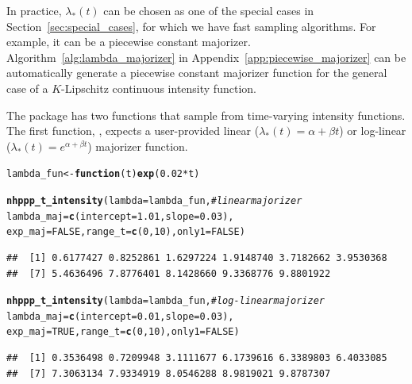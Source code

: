 \documentclass[article,nojss]{jss}\usepackage[]{graphicx}\usepackage[]{xcolor}
\makeatletter
\newcommand{\hlnum}[1]{\textcolor[rgb]{0.686,0.059,0.569}{#1}}%
\newcommand{\hlcom}[1]{\textcolor[rgb]{0.678,0.584,0.686}{\textit{#1}}}%
\newcommand{\hlopt}[1]{\textcolor[rgb]{0,0,0}{#1}}%
\newcommand{\hlstd}[1]{\textcolor[rgb]{0.345,0.345,0.345}{#1}}%
\newcommand{\hlkwa}[1]{\textcolor[rgb]{0.161,0.373,0.58}{\textbf{#1}}}%
\newcommand{\hlkwb}[1]{\textcolor[rgb]{0.69,0.353,0.396}{#1}}%
\newcommand{\hlkwc}[1]{\textcolor[rgb]{0.333,0.667,0.333}{#1}}%
\newcommand{\hlkwd}[1]{\textcolor[rgb]{0.737,0.353,0.396}{\textbf{#1}}}%
\newenvironment{kframe}{%
 \def\at@end@of@kframe{}%
 \ifinner\ifhmode%
  \def\at@end@of@kframe{\end{minipage}}%
  \begin{minipage}{\columnwidth}%
 \fi\fi%
 \def\FrameCommand##1{\hskip\@totalleftmargin \hskip-\fboxsep
 \colorbox{shadecolor}{##1}\hskip-\fboxsep
     \hskip-\linewidth \hskip-\@totalleftmargin \hskip\columnwidth}%
 \MakeFramed {\advance\hsize-\width
   \@totalleftmargin\z@ \linewidth\hsize
   \@setminipage}}%
 {\par\unskip\endMakeFramed%
 \at@end@of@kframe}
\newenvironment{knitrout}{}{} %
\newcommand{\fct}[1]{\code{#1()}}
\makeatother
\begin{document}
In practice, $\lambda_*(t)$ can be chosen as one of the special cases in Section~\ref{sec:special_cases}, for which we have fast sampling algorithms. For example, it can be a piecewise constant majorizer. Algorithm~\ref{alg:lambda_majorizer} in Appendix~\ref{app:piecewise_majorizer} can be automatically generate a piecewise constant majorizer function for the general case of a $K$-Lipschitz continuous intensity function.

The  package has two functions that sample from time-varying intensity functions. The first function, \fct{nhppp\_t\_intensity}, expects a user-provided linear ($\lambda_*(t) = \alpha + \beta t$) or log-linear ($\lambda_*(t) = e^{\alpha + \beta t}$) majorizer function.

\begin{knitrout}
\color{fgcolor}\begin{kframe}
\begin{alltt}
\hlstd{lambda_fun} \hlkwb{<-} \hlkwa{function}\hlstd{(}\hlkwc{t}\hlstd{)} \hlkwd{exp}\hlstd{(}\hlnum{0.02}\hlopt{*}\hlstd{t)}

\hlkwd{nhppp_t_intensity}\hlstd{(}\hlkwc{lambda} \hlstd{= lambda_fun,}         \hlcom{# linear majorizer}
  \hlkwc{lambda_maj} \hlstd{=} \hlkwd{c}\hlstd{(}\hlkwc{intercept} \hlstd{=} \hlnum{1.01}\hlstd{,} \hlkwc{slope} \hlstd{=} \hlnum{0.03}\hlstd{),}
  \hlkwc{exp_maj} \hlstd{=} \hlnum{FALSE}\hlstd{,} \hlkwc{range_t} \hlstd{=} \hlkwd{c}\hlstd{(}\hlnum{0}\hlstd{,} \hlnum{10}\hlstd{),} \hlkwc{only1} \hlstd{=} \hlnum{FALSE}\hlstd{)}
\end{alltt}
\begin{verbatim}
##  [1] 0.6177427 0.8252861 1.6297224 1.9148740 3.7182662 3.9530368
##  [7] 5.4636496 7.8776401 8.1428660 9.3368776 9.8801922
\end{verbatim}
\begin{alltt}
\hlkwd{nhppp_t_intensity}\hlstd{(}\hlkwc{lambda} \hlstd{= lambda_fun,}         \hlcom{# log-linear majorizer}
  \hlkwc{lambda_maj} \hlstd{=} \hlkwd{c}\hlstd{(}\hlkwc{intercept} \hlstd{=} \hlnum{0.01}\hlstd{,} \hlkwc{slope} \hlstd{=} \hlnum{0.03}\hlstd{),}
  \hlkwc{exp_maj} \hlstd{=} \hlnum{TRUE}\hlstd{,} \hlkwc{range_t} \hlstd{=} \hlkwd{c}\hlstd{(}\hlnum{0}\hlstd{,} \hlnum{10}\hlstd{),} \hlkwc{only1} \hlstd{=} \hlnum{FALSE}\hlstd{)}
\end{alltt}
\begin{verbatim}
##  [1] 0.3536498 0.7209948 3.1111677 6.1739616 6.3389803 6.4033085
##  [7] 7.3063134 7.9334919 8.0546288 8.9819021 9.8787307
\end{verbatim}
\end{kframe}
\end{knitrout}
\end{document}
